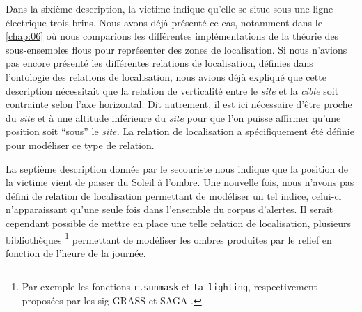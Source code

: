 Dans la sixième description, la victime indique qu'elle se situe sous
une ligne électrique trois brins. Nous avons déjà présenté ce cas,
notamment dans le \autoref{chap:06} où nous comparions les différentes
implémentations de la théorie des sous-ensembles flous pour
représenter des zones de localisation. Si nous n'avions pas encore
présenté les différentes relations de localisation, définies dans
l'ontologie des relations de localisation, nous avions déjà expliqué
que cette description nécessitait que la relation de verticalité entre
le \emph{site} et la \emph{cible} soit contrainte selon l'axe
horizontal. Dit autrement, il est ici nécessaire d'être proche du
\emph{site} et à une altitude inférieure du \emph{site} pour que l'on
puisse affirmer qu'une position soit \enquote{sous} le \emph{site.}
La relation de localisation  a spécifiquement
été définie pour modéliser ce type de relation.

La septième description donnée par le secouriste nous indique que la
position de la victime vient de passer du Soleil à l'ombre. Une
nouvelle fois, nous n'avons pas défini de relation de localisation
permettant de modéliser un tel indice, celui-ci n'apparaissant qu'une
seule fois dans l'ensemble du corpus d'alertes. Il serait cependant
possible de mettre en place une telle relation de localisation,
plusieurs bibliothèques \footnote{Par exemple les fonctions
  \texttt{r.sunmask} et \texttt{ta\_lighting}, respectivement
  proposées par les \ac{sig} GRASS \autocite{GDT2020} et SAGA
  \autocite{Conrad2015}.} permettant de modéliser les ombres produites
par le relief en fonction de l'heure de la journée.

